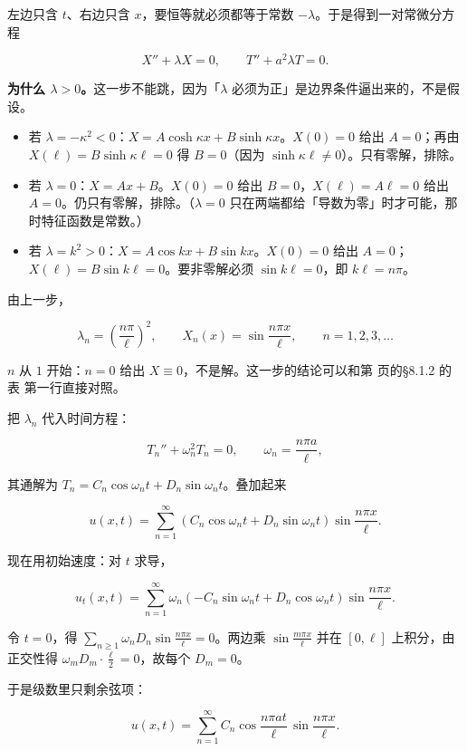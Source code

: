 左边只含 $t$、右边只含 $x$，要恒等就必须都等于常数 $-\lambda$。于是得到一对常微分方程

\[
X''+\lambda X=0,
\qquad
T''+a^2\lambda T=0 .
\]

\textbf{为什么 $\lambda>0$。}这一步不能跳，因为「$\lambda$ 必须为正」是边界条件逼出来的，不是假设。

\begin{itemize}
  \item 若 $\lambda=-\kappa^2<0$：$X=A\cosh\kappa x+B\sinh\kappa x$。$X(0)=0$ 给出 $A=0$；再由 $X(\ell)=B\sinh\kappa\ell=0$ 得 $B=0$（因为 $\sinh\kappa\ell\ne0$）。只有零解，排除。
  \item 若 $\lambda=0$：$X=Ax+B$。$X(0)=0$ 给出 $B=0$，$X(\ell)=A\ell=0$ 给出 $A=0$。仍只有零解，排除。（$\lambda=0$ 只在两端都给「导数为零」时才可能，那时特征函数是常数。）
  \item 若 $\lambda=k^2>0$：$X=A\cos kx+B\sin kx$。$X(0)=0$ 给出 $A=0$；$X(\ell)=B\sin k\ell=0$。要非零解必须 $\sin k\ell=0$，即 $k\ell=n\pi$。
\end{itemize}


由上一步，

\[
\lambda_n=\left(\frac{n\pi}{\ell}\right)^2,
\qquad
X_n(x)=\sin\frac{n\pi x}{\ell},
\qquad n=1,2,3,\dots
\]

$n$ 从 $1$ 开始：$n=0$ 给出 $X\equiv0$，不是解。这一步的结论可以和第 \pageref{sec:8111} 页的§8.1.2 的表 第一行直接对照。


把 $\lambda_n$ 代入时间方程：

\[
T_n''+\omega_n^2T_n=0,
\qquad
\omega_n=\frac{n\pi a}{\ell},
\]

其通解为 $T_n=C_n\cos\omega_nt+D_n\sin\omega_nt$。叠加起来

\[
u(x,t)=\sum_{n=1}^{\infty}\left(C_n\cos\omega_nt+D_n\sin\omega_nt\right)\sin\frac{n\pi x}{\ell}.
\]

现在用初始速度：对 $t$ 求导，

\[
u_t(x,t)=\sum_{n=1}^{\infty}\omega_n\left(-C_n\sin\omega_nt+D_n\cos\omega_nt\right)\sin\frac{n\pi x}{\ell}.
\]

令 $t=0$，得 $\sum_{n\ge1}\omega_nD_n\sin\frac{n\pi x}{\ell}=0$。两边乘 $\sin\frac{m\pi x}{\ell}$ 并在 $[0,\ell]$ 上积分，由正交性得 $\omega_mD_m\cdot\frac{\ell}{2}=0$，故每个 $D_m=0$。

于是级数里只剩余弦项：

\[
u(x,t)=\sum_{n=1}^{\infty}C_n\cos\frac{n\pi at}{\ell}\,\sin\frac{n\pi x}{\ell}.
\]

